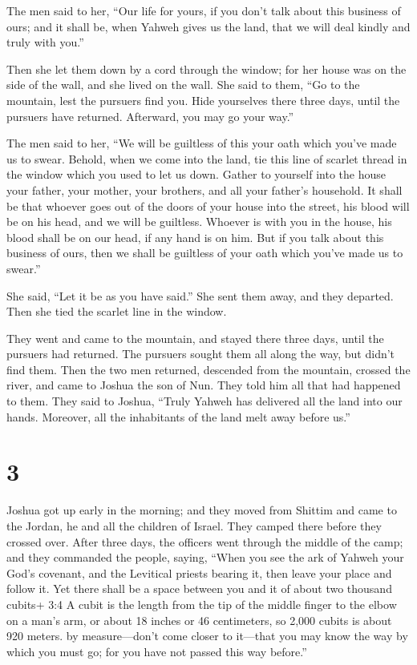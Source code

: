  The men said to her, ``Our life for yours, if you don't
talk about this business of ours; and it shall be, when Yahweh gives us
the land, that we will deal kindly and truly with you.''

 Then she let them down by a cord through the window; for
her house was on the side of the wall, and she lived on the wall.
 She said to them, ``Go to the mountain, lest the pursuers
find you. Hide yourselves there three days, until the pursuers have
returned. Afterward, you may go your way.''

 The men said to her, ``We will be guiltless of this your
oath which you've made us to swear.  Behold, when we come
into the land, tie this line of scarlet thread in the window which you
used to let us down. Gather to yourself into the house your father, your
mother, your brothers, and all your father's household.  It
shall be that whoever goes out of the doors of your house into the
street, his blood will be on his head, and we will be guiltless. Whoever
is with you in the house, his blood shall be on our head, if any hand is
on him.  But if you talk about this business of ours, then
we shall be guiltless of your oath which you've made us to swear.''

 She said, ``Let it be as you have said.'' She sent them
away, and they departed. Then she tied the scarlet line in the window.

 They went and came to the mountain, and stayed there three
days, until the pursuers had returned. The pursuers sought them all
along the way, but didn't find them.  Then the two men
returned, descended from the mountain, crossed the river, and came to
Joshua the son of Nun. They told him all that had happened to them.
 They said to Joshua, ``Truly Yahweh has delivered all the
land into our hands. Moreover, all the inhabitants of the land melt away
before us.''

\hypertarget{section-2}{%
\section{3}\label{section-2}}

 Joshua got up early in the morning; and they moved from
Shittim and came to the Jordan, he and all the children of Israel. They
camped there before they crossed over.  After three days,
the officers went through the middle of the camp;  and they
commanded the people, saying, ``When you see the ark of Yahweh your
God's covenant, and the Levitical priests bearing it, then leave your
place and follow it.  Yet there shall be a space between you
and it of about two thousand cubits+ 3:4 A cubit is the length from the
tip of the middle finger to the elbow on a man's arm, or about 18 inches
or 46 centimeters, so 2,000 cubits is about 920 meters. by
measure---don't come closer to it---that you may know the way by which
you must go; for you have not passed this way before.''

